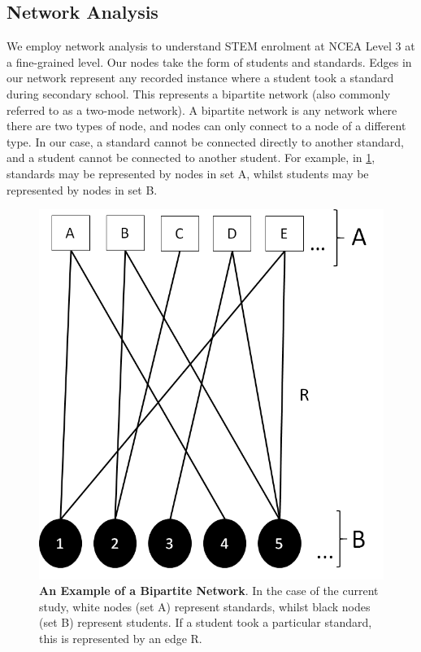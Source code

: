 \subsection{Network Analysis}
We employ network analysis to understand STEM enrolment at NCEA Level 3 at a fine-grained level. Our nodes take the form of students and standards. Edges in our network represent any recorded instance where a student took a standard during secondary school. This represents a bipartite network (also commonly referred to as a two-mode network). A bipartite network is any network where there are two types of node, and nodes can only connect to a node of a different type. In our case, a standard cannot be connected directly to another standard, and a student cannot be connected to another student. For example, in \ref{fig:BipariteNetwork}, standards may be represented by nodes in set A, whilst students may be represented by nodes in set B.
\begin{figure}
    \centering
    \includegraphics{C2 - Student Pathways/Bipartite_Network.png}
    \caption{\textbf{An Example of a Bipartite Network}. In the case of the current study, white nodes (set A) represent standards, whilst black nodes (set B) represent students. If a student took a particular standard, this is represented by an edge R.}
    \label{fig:BipariteNetwork}
\end{figure}

